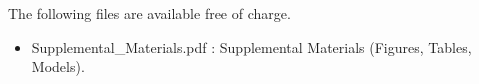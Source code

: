 \documentclass[journal=esthag,manuscript=article]{achemso}
\begin{document}

\begin{suppinfo}
The following files are available free of charge.
\begin{itemize}
  \item Supplemental\_Materials.pdf : Supplemental Materials (Figures, Tables, Models).
\end{itemize}
\end{suppinfo}



\end{document}
